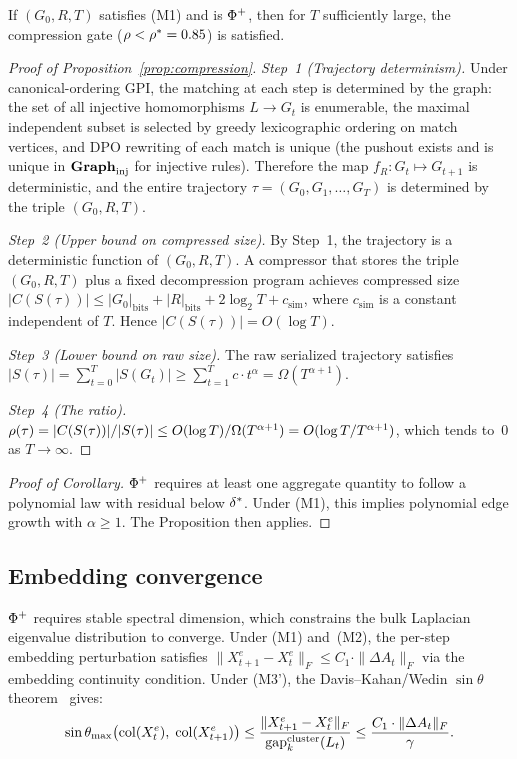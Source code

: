 \documentclass{../shared/primo}
\begin{document}
\begin{corollary}
If $(G_0, R, T)$ satisfies \textup{(M1)} and is $\Phi\textsuperscript{+}$, then for $T$ sufficiently large, the compression gate ($\rho < \rho^* = 0.85$) is satisfied.
\end{corollary}

\begin{proof}[Proof of Proposition~\ref{prop:compression}]
\emph{Step~1 (Trajectory determinism).} Under canonical-ordering GPI, the matching at each step is determined by the graph: the set of all injective homomorphisms $L \to G_t$ is enumerable, the maximal independent subset is selected by greedy lexicographic ordering on match vertices, and DPO rewriting of each match is unique (the pushout exists and is unique in $\mathbf{Graph}_{\mathrm{inj}}$ for injective rules). Therefore the map $f_R: G_t \mapsto G_{t+1}$ is deterministic, and the entire trajectory $\tau = (G_0, G_1, \ldots, G_T)$ is determined by the triple $(G_0, R, T)$.

\emph{Step~2 (Upper bound on compressed size).} By Step~1, the trajectory is a deterministic function of $(G_0, R, T)$. A compressor that stores the triple $(G_0, R, T)$ plus a fixed decompression program achieves compressed size $|C(S(\tau))| \leq |G_0|_{\text{bits}} + |R|_{\text{bits}} + 2 \log_2 T + c_{\text{sim}}$, where $c_{\text{sim}}$ is a constant independent of $T$. Hence $|C(S(\tau))| = O(\log T)$.

\emph{Step~3 (Lower bound on raw size).} The raw serialized trajectory satisfies $|S(\tau)| = \sum_{t=0}^{T} |S(G_t)| \geq \sum_{t=1}^{T} c \cdot t^{\alpha} = \Omega(T^{\alpha+1})$.

\emph{Step~4 (The ratio).} $\rho(\tau) = |C(S(\tau))| / |S(\tau)| \leq O(\log T) / \Omega(T^{\alpha+1}) = O(\log T / T^{\alpha+1})$, which tends to~0 as $T \to \infty$.
\end{proof}

\begin{proof}[Proof of Corollary]
$\Phi\textsuperscript{+}$ requires at least one aggregate quantity to follow a polynomial law with residual below $\delta^*$. Under (M1), this implies polynomial edge growth with $\alpha \geq 1$. The Proposition then applies.
\end{proof}

\subsection*{Embedding convergence}

$\Phi\textsuperscript{+}$ requires stable spectral dimension, which constrains the bulk Laplacian eigenvalue distribution to converge. Under (M1) and~(M2), the per-step embedding perturbation satisfies $\|X_{t+1}^e - X_t^e\|_F \leq C_1 \cdot \|\Delta A_t\|_F$ via the embedding continuity condition. Under (M3'), the Davis--Kahan/Wedin $\sin\theta$ theorem~\cite{davis1970rotation,wedin1972perturbation} gives:
\[
\sin\theta_{\max}\bigl(\operatorname{col}(X_t^e),\; \operatorname{col}(X_{t+1}^e)\bigr) \leq \frac{\|X_{t+1}^e - X_t^e\|_F}{\mathrm{gap}_k^{\mathrm{cluster}}(L_t)} \leq \frac{C_1 \cdot \|\Delta A_t\|_F}{\gamma}.
\]
\end{document}
